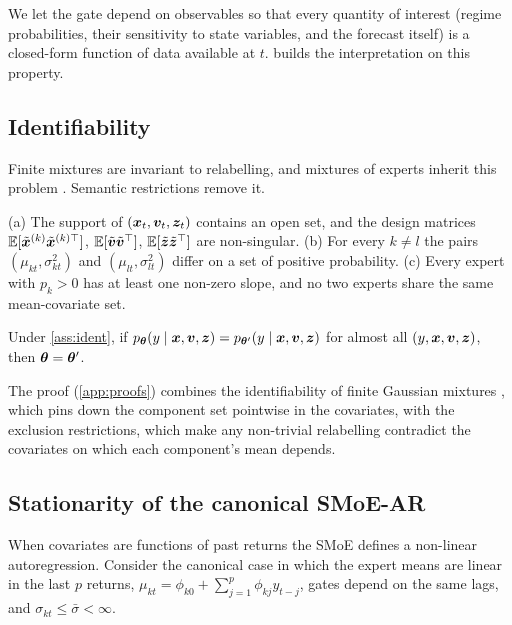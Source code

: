 \noindent We let the gate depend on observables so that every quantity of interest (regime
probabilities, their sensitivity to state variables, and the forecast itself) is a closed-form
function of data available at $t$.  builds the interpretation on this property.

\subsection{Identifiability}

Finite mixtures are invariant to relabelling, and mixtures of experts inherit this problem
\citep{jiang1999identifiability}. Semantic restrictions remove it.

\begin{assumption}\label{ass:ident}
(a) The support of $(\bm{x}_t,\bm{v}_t,\bm{z}_t)$ contains an open set, and the design matrices
$\mathbb{E}[\tilde{\bm{x}}^{(k)}\tilde{\bm{x}}^{(k)\top}]$, $\mathbb{E}[\tilde{\bm{v}}\tilde{\bm{v}}^\top]$, $\mathbb{E}[\tilde{\bm{z}}\tilde{\bm{z}}^\top]$
are non-singular. (b) For every $k\neq l$ the pairs $(\mu_{kt},\sigma^2_{kt})$ and
$(\mu_{lt},\sigma^2_{lt})$ differ on a set of positive probability. (c) Every expert with
$p_k>0$ has at least one non-zero slope, and no two experts share the same mean-covariate set.
\end{assumption}

\begin{proposition}[Identifiability]\label{prop:ident}
Under \cref{ass:ident}, if $p_{\bm{\theta}}(y\mid\bm{x},\bm{v},\bm{z})=p_{\bm{\theta}'}(y\mid\bm{x},\bm{v},\bm{z})$ for almost
all $(y,\bm{x},\bm{v},\bm{z})$, then $\bm{\theta}=\bm{\theta}'$.
\end{proposition}

\noindent The proof (\cref{app:proofs}) combines the identifiability of finite Gaussian mixtures
\citep{teicher1963identifiability}, which pins down the component set pointwise in the covariates, with
the exclusion restrictions, which make any non-trivial relabelling contradict the covariates on
which each component's mean depends.

\subsection{Stationarity of the canonical SMoE-AR}

When covariates are functions of past returns the SMoE defines a non-linear autoregression.
Consider the canonical case in which the expert means are linear in the last $p$ returns,
$\mu_{kt}=\phi_{k0}+\sum_{j=1}^p\phi_{kj}y_{t-j}$, gates depend on the same lags, and
$\sigma_{kt}\le\bar\sigma<\infty$.

